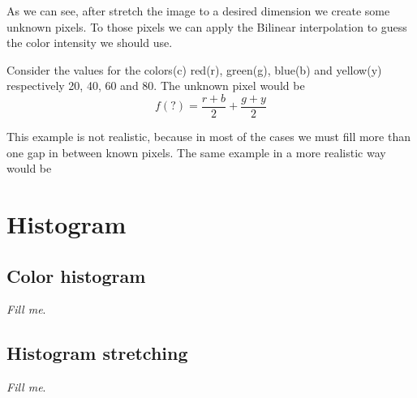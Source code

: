 \documentclass{report}
\begin{document}
	As we can see, after stretch the image to a desired dimension we create some unknown pixels. To those pixels we can apply the Bilinear interpolation 
	to guess the color intensity we should use.

	Consider the values for the colors(c) red(r), green(g), blue(b) and yellow(y) respectively 20, 40, 60 and 80. The unknown pixel would be \[ f(?)=\frac{r+b}{2} + \frac{g+y}{2} \]

	This example is not realistic, because in most of the cases we must fill more than one gap in between known pixels. The same example in a more realistic way would be
	
	

\section{Histogram}

	\subsection{Color histogram}

		\textit{Fill me}.

	\subsection{Histogram stretching}

		\textit{Fill me}.
\end{document}
